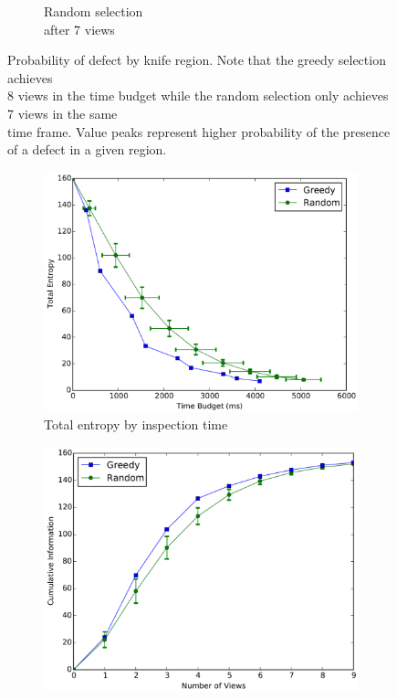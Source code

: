 \documentclass[letterpaper, 10 pt, conference]{ieeeconf}  %
\begin{document}
\begin{figure}
\begin{subfigure}[b]{.24\textwidth}
        \caption{Random selection \\ after 7 views}
        \vspace*{2mm}
        \label{fig:rand7view}
    \end{subfigure}
    \caption{Probability of defect by knife region. Note that the greedy selection achieves \\ 8 views in the time budget while the random selection only achieves 7 views in the same \\ time frame. Value peaks represent higher probability of the presence of a defect in a given region.}
    \label{fig:prob_dists}
\end{figure}

\begin{figure}
    \centering
    \begin{subfigure}[b]{.49\textwidth}
        \centering
        \includegraphics[width=.99\textwidth]{finite_views.png}
        \caption{Total entropy by inspection time}
        \vspace*{2mm}
        \label{fig:info_by_time}
    \end{subfigure}
    \hfill
    \begin{subfigure}[b]{.49\textwidth}
        \centering
        {\includegraphics[width=.97\textwidth]{info_gain_views.png}}

\end{subfigure}
\end{figure}
\end{document}
